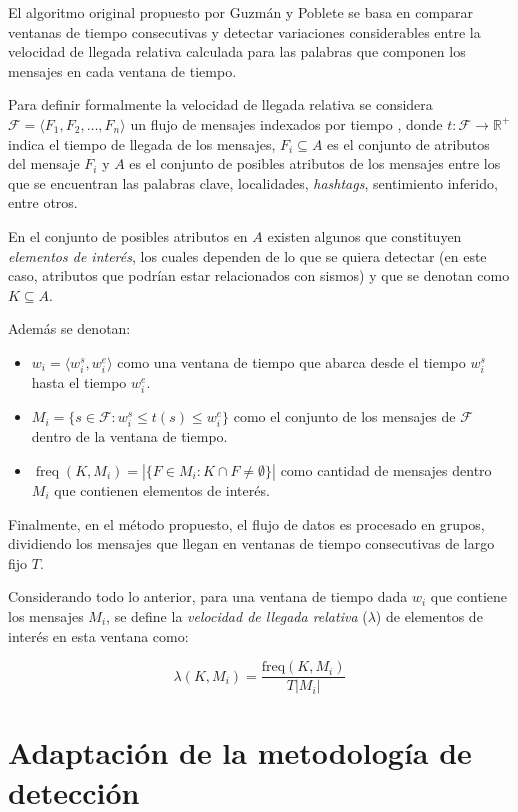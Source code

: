 El algoritmo original propuesto por Guzmán y Poblete se basa en comparar ventanas de tiempo consecutivas y detectar variaciones considerables entre la velocidad de llegada relativa calculada para las palabras que componen los mensajes en cada ventana de tiempo.

Para definir formalmente la velocidad de llegada relativa se considera ${\mathcal F} = \langle F_1, F_2, \dots, F_n \rangle$ un flujo de mensajes indexados por tiempo , donde  $t: {\mathcal F} \rightarrow \mathbb{R}^+$ indica el tiempo de llegada de los mensajes, $F_i \subseteq A$ es el conjunto de atributos del mensaje $F_i$ y $A$ es el conjunto de posibles atributos de los mensajes entre los que se encuentran las palabras clave, localidades, \textit{hashtags}, sentimiento inferido, entre otros.  

En el conjunto de posibles atributos en $A$ existen algunos que constituyen \emph{elementos de interés}, los cuales dependen de lo que se quiera detectar (en este caso, atributos que podrían estar relacionados con sismos) y que se denotan como $K \subseteq A$.

Además se denotan:
\begin{itemize}
	\item $w_i = \langle w^s_i, w^e_i \rangle$ como una ventana de tiempo que abarca desde el tiempo $w^s_i$ hasta el tiempo $w^e_i$.
 	\item $M_i = \{ s \in {\mathcal F}: w^s_i \le t(s) \le w^e_i \}$ como el conjunto de los mensajes de ${\mathcal F}$ dentro de la ventana de tiempo. 
	\item $\operatorname{freq}(K, M_i) = | \{ F \in M_i: K \cap F \neq \emptyset \} |$ como cantidad de mensajes dentro $M_i$ que contienen elementos de interés.
\end{itemize}

Finalmente, en el método propuesto, el flujo de datos es procesado en grupos, dividiendo los mensajes que llegan en ventanas de tiempo consecutivas de largo fijo $T$.

Considerando todo lo anterior, para una ventana de tiempo dada $w_i$ que contiene los mensajes $M_i$, se define la \emph{velocidad de llegada relativa} ($\lambda$) de elementos de interés en esta ventana como:

\begin{equation}
\label{eq:lambda}
\lambda(K, M_i) = \frac{\mathrm{freq}(K,M_i)}{T|M_i|}
\end{equation}

\section{Adaptación de la metodología de detección}

